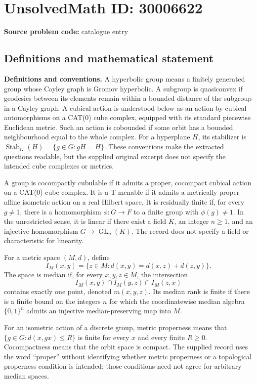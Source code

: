 \documentclass[11pt]{article}
\begin{document}
\section*{UnsolvedMath ID: 30006622}
\textbf{Source problem code:} catalogue entry
\subsection{Definitions and mathematical statement}
\textbf{Definitions and conventions.} A hyperbolic group means a finitely generated group whose Cayley graph is Gromov hyperbolic. A subgroup is quasiconvex if geodesics between its elements remain within a bounded distance of the subgroup in a Cayley graph. A cubical action is understood below as an action by cubical automorphisms on a CAT(0) cube complex, equipped with its standard piecewise Euclidean metric. Such an action is cobounded if some orbit has a bounded neighbourhood equal to the whole complex. For a hyperplane $H$, its stabilizer is $\operatorname{Stab}_G(H)=\{g\in G:gH=H\}$. These conventions make the extracted questions readable, but the supplied original excerpt does not specify the intended cube complexes or metrics.

A group is cocompactly cubulable if it admits a proper, cocompact cubical action on a CAT(0) cube complex. It is a-T-menable if it admits a metrically proper affine isometric action on a real Hilbert space. It is residually finite if, for every $g\ne 1$, there is a homomorphism $\phi:G\to F$ to a finite group with $\phi(g)\ne 1$. In the unrestricted sense, it is linear if there exist a field $K$, an integer $n\geq 1$, and an injective homomorphism $G\to\operatorname{GL}_n(K)$. The record does not specify a field or characteristic for linearity.

For a metric space $(M,d)$, define
\[
 I_M(x,y)=\{z\in M:d(x,y)=d(x,z)+d(z,y)\}.
\]
The space is median if, for every $x,y,z\in M$, the intersection
\[
 I_M(x,y)\cap I_M(y,z)\cap I_M(z,x)
\]
contains exactly one point, denoted $m(x,y,z)$. Its median rank is finite if there is a finite bound on the integers $n$ for which the coordinatewise median algebra $\{0,1\}^n$ admits an injective median-preserving map into $M$.

For an isometric action of a discrete group, metric properness means that $\{g\in G:d(x,gx)\leq R\}$ is finite for every $x$ and every finite $R\geq 0$. Cocompactness means that the orbit space is compact. The supplied record uses the word ``proper'' without identifying whether metric properness or a topological properness condition is intended; those conditions need not agree for arbitrary median spaces.
\end{document}
